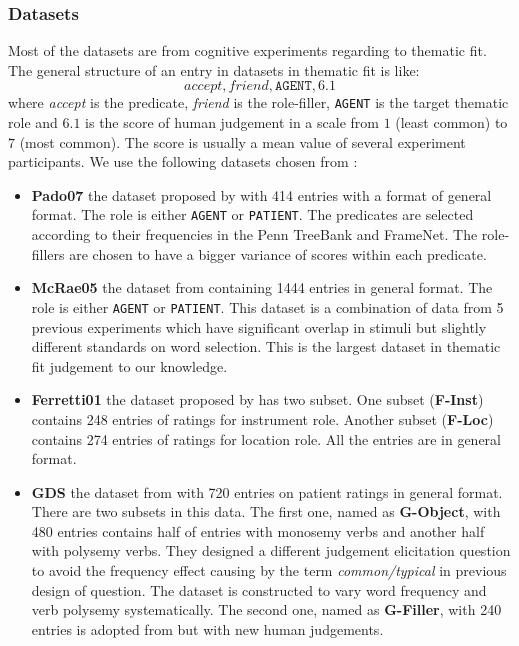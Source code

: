 \documentclass[a4paper]{article}
\begin{document}
\subsubsection{Datasets} \label{sec:dataset-thematic}
Most of the datasets are from cognitive experiments regarding to thematic fit. The general structure of an entry in datasets in thematic fit is like: 
\begin{equation} \label{eg:data-thematic}
    accept, friend, \texttt{AGENT}, 6.1
\end{equation}
where \textit{accept} is the predicate, \textit{friend} is the role-filler, \texttt{AGENT} is the target thematic role and $6.1$ is the score of human judgement in a scale from $1$ (least common) to $7$ (most common). The score is usually a mean value of several experiment participants. We use the following datasets chosen from \citet{sayeed2016thematic}: 
\begin{itemize}
\item \textbf{Pado07}   the dataset proposed by \citet{pado2007integration} with 414 entries with a format of general format. The role is either \texttt{AGENT} or \texttt{PATIENT}. The predicates are selected according to their frequencies in the Penn TreeBank and FrameNet. The role-fillers are chosen to have a bigger variance of scores within each predicate. 
\item \textbf{McRae05}  the dataset from \citet{mcrae2005basis} containing 1444 entries in general format. The role is either \texttt{AGENT} or \texttt{PATIENT}. This dataset is a combination of data from 5 previous experiments which have significant overlap in stimuli but slightly different standards on word selection. This is the largest dataset in thematic fit judgement to our knowledge. 
\item \textbf{Ferretti01} the dataset proposed by  \citet{ferretti2001integrating} has two subset. One subset (\textbf{F-Inst}) contains 248 entries of ratings for instrument role. Another subset (\textbf{F-Loc}) contains 274 entries of ratings for location role. All the entries are in general format. 
\item \textbf{GDS}  the dataset from \citet{greenberg2015verb} with 720 entries on patient ratings in general format. There are two subsets in this data. The first one, named as \textbf{G-Object}, with 480 entries contains half of entries with monosemy verbs and another half with polysemy verbs. They designed a different judgement elicitation question to avoid the frequency effect causing by the term \textit{common/typical} in previous design of question. The dataset is constructed to vary word frequency and verb polysemy systematically. The second one, named as \textbf{G-Filler}, with 240 entries is adopted from \citet{mcrae1998modeling} but with new human judgements. 
\end{itemize}
\end{document}
